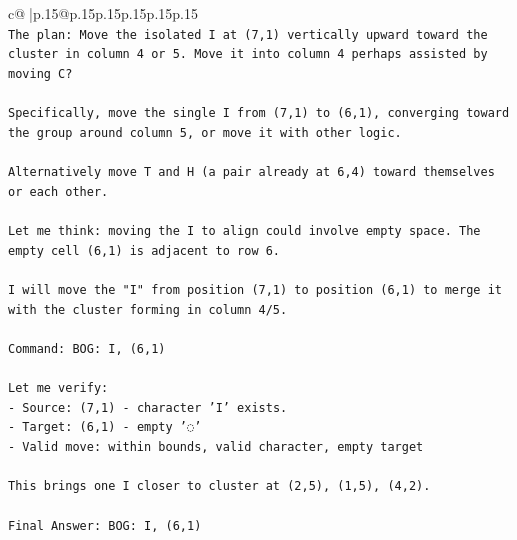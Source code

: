 \documentclass{article}
\begin{document}
{\begin{supertabular}{c@{$\;$}|p{.15\linewidth}@{}p{.15\linewidth}p{.15\linewidth}p{.15\linewidth}p{.15\linewidth}p{.15\linewidth}}
{{{\\ 
\texttt{The plan: Move the isolated I at (7,1) vertically upward toward the cluster in column 4 or 5. Move it into column 4 perhaps assisted by moving C?} \\
\\ 
\texttt{Specifically, move the single I from (7,1) to (6,1), converging toward the group around column 5, or move it with other logic.} \\
\\ 
\texttt{Alternatively move T and H (a pair already at 6,4) toward themselves or each other.} \\
\\ 
\texttt{Let me think: moving the I to align could involve empty space. The empty cell (6,1) is adjacent to row 6.} \\
\\ 
\texttt{I will move the "I" from position (7,1) to position (6,1) to merge it with the cluster forming in column 4/5.} \\
\\ 
\texttt{Command: BOG: I, (6,1)} \\
\\ 
\texttt{Let me verify:} \\
\texttt{{-} Source: (7,1) {-} character 'I' exists.} \\
\texttt{{-} Target: (6,1) {-} empty '◌' } \\
\texttt{{-} Valid move: within bounds, valid character, empty target} \\
\\ 
\texttt{This brings one I closer to cluster at (2,5), (1,5), (4,2).} \\
\\ 
\texttt{Final Answer: BOG: I, (6,1)} \\
            }
        }
    }
     \\ \\


\end{supertabular}}
\end{document}
